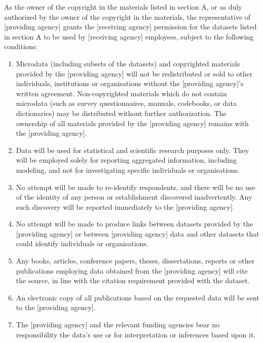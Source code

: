 \documentclass[letterpaper,10pt,english]{sphinxmanual}
\begin{document}
As the owner of the copyright in the materials listed in section A, or
as duly authorized by the owner of the copyright in the materials, the
representative of {[}providing agency{]} grants the {[}receiving agency{]}
permission for the datasets listed in section A to be used by {[}receiving
agency{]} employees, subject to the following conditions:
\begin{enumerate}
\item {} 
Microdata (including subsets of the datasets) and copyrighted
materials provided by the {[}providing agency{]} will not be
redistributed or sold to other individuals, institutions or
organisations without the {[}providing agency{]}’s written agreement.
Non-copyrighted materials which do not contain microdata (such as
survey questionnaires, manuals, codebooks, or data dictionaries) may
be distributed without further authorization. The ownership of all
materials provided by the {[}providing agency{]} remains with the
{[}providing agency{]}.

\item {} 
Data will be used for statistical and scientific research purposes
only. They will be employed solely for reporting aggregated
information, including modeling, and not for investigating specific
individuals or organisations.

\item {} 
No attempt will be made to re-identify respondents, and there will
be no use of the identity of any person or establishment discovered
inadvertently. Any such discovery will be reported immediately to
the {[}providing agency{]}.

\item {} 
No attempt will be made to produce links between datasets provided
by the {[}providing agency{]} or between {[}providing agency{]} data and
other datasets that could identify individuals or organisations.

\item {} 
Any books, articles, conference papers, theses, dissertations,
reports or other publications employing data obtained from the
{[}providing agency{]} will cite the source, in line with the citation
requirement provided with the dataset.

\item {} 
An electronic copy of all publications based on the requested data
will be sent to the {[}providing agency{]}.

\item {} 
The {[}providing agency{]} and the relevant funding agencies bear no
responsibility the data’s use or for interpretation or inferences
based upon it.


\end{enumerate}
\end{document}
